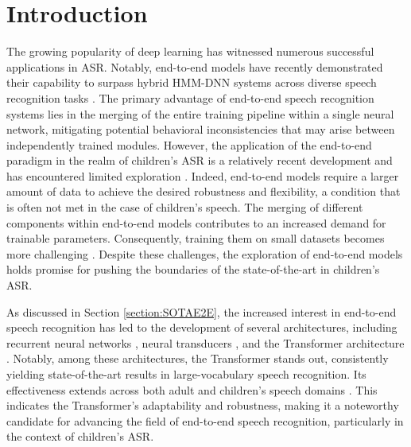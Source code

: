 \label{chap:4}
\cleardoublepage
\section{Introduction}
The growing popularity of deep learning has witnessed numerous successful applications in \ac{ASR}. Notably, end-to-end models have recently demonstrated their capability to surpass hybrid \ac{HMM-DNN} systems across diverse speech recognition tasks \cite{zeyer2019comparison,zeineldeen2022Conformer}. The primary advantage of end-to-end speech recognition systems lies in the merging of the entire training pipeline within a single neural network, mitigating potential behavioral inconsistencies that may arise between independently trained modules.
However, the application of the end-to-end paradigm in the realm of children's \ac{ASR} is a relatively recent development and has encountered limited exploration \cite{gelin2021endtoend,sri_end2end,chen2020data,ng2020cuhk}. Indeed, end-to-end models require a larger amount of data to achieve the desired robustness and flexibility, a condition that is often not met in the case of children's speech. The merging of different components within end-to-end models contributes to an increased demand for trainable parameters. Consequently, training them on small datasets becomes more challenging \cite{luscher2019rwth}. Despite these challenges, the exploration of end-to-end models holds promise for pushing the boundaries of the state-of-the-art in children's \ac{ASR}.


As discussed in Section \ref{section:SOTAE2E}, the increased interest in end-to-end speech recognition has led to the development of several architectures, including recurrent neural networks \cite{soltau2016neural}, neural transducers \cite{battenberg2017exploring}, and the Transformer architecture \cite{vaswani2017attention}. Notably, among these architectures, the Transformer stands out, consistently yielding state-of-the-art results in large-vocabulary speech recognition. Its effectiveness extends across both adult and children's speech domains \cite{gelin2021endtoend}. This indicates the Transformer's adaptability and robustness, making it a noteworthy candidate for advancing the field of end-to-end speech recognition, particularly in the context of children's \ac{ASR}.


